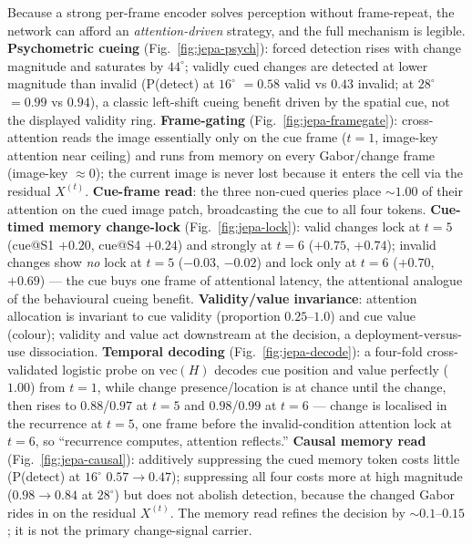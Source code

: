 Because a strong per-frame encoder solves perception without frame-repeat, the network can
afford an \emph{attention-driven} strategy, and the full mechanism is legible.
\textbf{Psychometric cueing} (Fig.~\ref{fig:jepa-psych}): forced detection rises with change
magnitude and saturates by $44^\circ$; validly cued changes are detected at lower magnitude
than invalid (P(detect) at $16^\circ$ $=0.58$ valid vs $0.43$ invalid; at $28^\circ$ $=0.99$
vs $0.94$), a classic left-shift cueing benefit driven by the spatial cue, not the displayed
validity ring. \textbf{Frame-gating} (Fig.~\ref{fig:jepa-framegate}): cross-attention reads
the image essentially only on the cue frame ($t{=}1$, image-key attention near ceiling) and
runs from memory on every Gabor/change frame (image-key $\approx0$); the current image is
never lost because it enters the cell via the residual $X^{(t)}$. \textbf{Cue-frame read}:
the three non-cued queries place $\sim1.00$ of their attention on the cued image patch,
broadcasting the cue to all four tokens. \textbf{Cue-timed memory change-lock}
(Fig.~\ref{fig:jepa-lock}): valid changes lock at $t{=}5$ (cue@S1 $+0.20$, cue@S4 $+0.24$)
and strongly at $t{=}6$ ($+0.75$, $+0.74$); invalid changes show \emph{no} lock at $t{=}5$
($-0.03$, $-0.02$) and lock only at $t{=}6$ ($+0.70$, $+0.69$) --- the cue buys one frame of
attentional latency, the attentional analogue of the behavioural cueing benefit.
\textbf{Validity/value invariance}: attention allocation is invariant to cue validity
(proportion $0.25$--$1.0$) and cue value (colour); validity and value act downstream at the
decision, a deployment-versus-use dissociation. \textbf{Temporal decoding}
(Fig.~\ref{fig:jepa-decode}): a four-fold cross-validated logistic probe on $\text{vec}(H)$
decodes cue position and value perfectly ($1.00$) from $t{=}1$, while change presence/location
is at chance until the change, then rises to $0.88$/$0.97$ at $t{=}5$ and $0.98$/$0.99$ at
$t{=}6$ --- change is localised in the recurrence at $t{=}5$, one frame before the
invalid-condition attention lock at $t{=}6$, so ``recurrence computes, attention reflects.''
\textbf{Causal memory read} (Fig.~\ref{fig:jepa-causal}): additively suppressing the cued
memory token costs little (P(detect) at $16^\circ$ $0.57\to0.47$); suppressing all four costs
more at high magnitude ($0.98\to0.84$ at $28^\circ$) but does not abolish detection, because
the changed Gabor rides in on the residual $X^{(t)}$. The memory read refines the decision by
$\sim0.1$--$0.15$; it is not the primary change-signal carrier.

